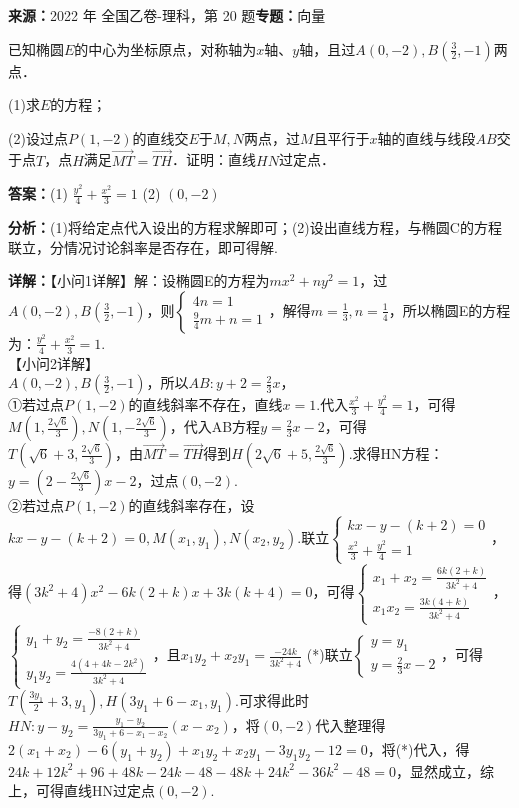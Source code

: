 \begin{question}[points=12]
\textbf{来源：}2022 年 全国乙卷-理科，第 20 题\quad \textbf{专题：}向量\par
已知椭圆$E$的中心为坐标原点，对称轴为$x$轴、$y$轴，且过$A(0,-2), B\left(\frac{3}{2},-1\right)$两点．

(1)求$E$的方程；

(2)设过点$P(1,-2)$的直线交$E$于$M,N$两点，过$M$且平行于$x$轴的直线与线段$AB$交于点$T$，点$H$满足$\overrightarrow{MT}=\overrightarrow{TH}$．证明：直线$HN$过定点．
\begin{solution}
\textbf{答案：}(1) $\frac{y^2}{4}+\frac{x^2}{3}=1$
(2) $(0,-2)$

\textbf{分析：}(1)将给定点代入设出的方程求解即可；(2)设出直线方程，与椭圆C的方程联立，分情况讨论斜率是否存在，即可得解.

\textbf{详解：}【小问1详解】解：设椭圆E的方程为$mx^2+ny^2=1$，过$A(0,-2), B\left(\frac{3}{2},-1\right)$，则$\begin{cases} 4n=1 \\ \frac{9}{4}m+n=1 \end{cases}$，解得$m=\frac{1}{3}, n=\frac{1}{4}$，所以椭圆E的方程为：$\frac{y^2}{4}+\frac{x^2}{3}=1$.\\【小问2详解】\\$A(0,-2), B(\frac{3}{2},-1)$，所以$AB: y+2 = \frac{2}{3}x$，\\①若过点$P(1,-2)$的直线斜率不存在，直线$x=1$.代入$\frac{x^2}{3}+\frac{y^2}{4}=1$，可得$M\left(1,\frac{2\sqrt{6}}{3}\right), N\left(1,-\frac{2\sqrt{6}}{3}\right)$，代入AB方程$y=\frac{2}{3}x-2$，可得\\$T\left(\sqrt{6}+3,\frac{2\sqrt{6}}{3}\right)$，由$\overrightarrow{MT}=\overrightarrow{TH}$得到$H\left(2\sqrt{6}+5,\frac{2\sqrt{6}}{3}\right)$.求得HN方程：$y=\left(2-\frac{2\sqrt{6}}{3}\right)x-2$，过点$(0,-2)$.\\②若过点$P(1,-2)$的直线斜率存在，设$kx-y-(k+2)=0, M(x_1,y_1), N(x_2,y_2)$.联立$\begin{cases} kx-y-(k+2)=0 \\ \frac{x^2}{3}+\frac{y^2}{4}=1 \end{cases}$，得$(3k^2+4)x^2 - 6k(2+k)x + 3k(k+4)=0$，可得$\begin{cases} x_1+x_2 = \frac{6k(2+k)}{3k^2+4} \\ x_1x_2 = \frac{3k(4+k)}{3k^2+4} \end{cases}$，$\begin{cases} y_1+y_2 = \frac{-8(2+k)}{3k^2+4} \\ y_1y_2 = \frac{4(4+4k-2k^2)}{3k^2+4} \end{cases}$，且$x_1y_2+x_2y_1 = \frac{-24k}{3k^2+4}$ (*)联立$\begin{cases} y=y_1 \\ y=\frac{2}{3}x-2 \end{cases}$，可得$T\left(\frac{3y_1}{2}+3, y_1\right), H(3y_1+6-x_1, y_1)$.可求得此时$HN: y-y_2 = \frac{y_1-y_2}{3y_1+6-x_1-x_2}(x-x_2)$，将$(0,-2)$代入整理得$2(x_1+x_2)-6(y_1+y_2)+x_1y_2+x_2y_1-3y_1y_2-12=0$，将(*)代入，得$24k+12k^2+96+48k-24k-48-48k+24k^2-36k^2-48=0$，显然成立，综上，可得直线HN过定点$(0,-2)$.
\end{solution}
\end{question}

